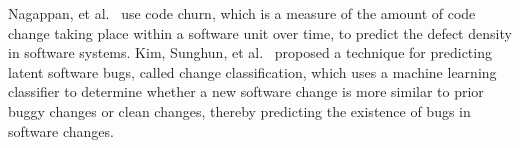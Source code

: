 Nagappan, et al.~\cite{nagappan2005use} use code churn, which is a measure of the amount of code change taking place within a software unit over time, to predict the defect density in software systems. Kim, Sunghun, et al.~\cite{kim2008classifying} proposed a technique for predicting latent software bugs, called change classification, which uses a machine learning classifier to determine whether a new software change is more similar to prior buggy changes or clean changes, thereby predicting the existence of bugs in software changes.







